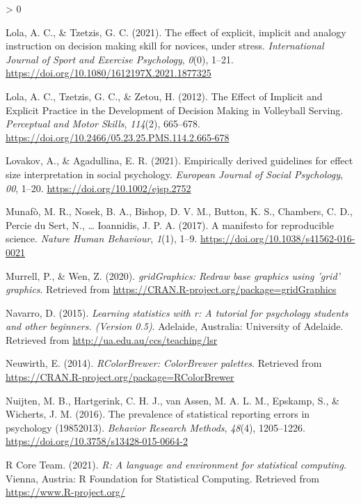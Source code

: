 \documentclass[
  english,
  man, donotrepeattitle,floatsintext]{apa7}
\newlength{\cslhangindent}
\newenvironment{CSLReferences}[2] %
 {%
  \setlength{\parindent}{0pt}
  \ifodd #1 \everypar{\setlength{\hangindent}{\cslhangindent}}\ignorespaces\fi
  \ifnum #2 > 0
  \setlength{\parskip}{#2\baselineskip}
  \fi
 }%
 {}
\begin{document}
\begin{CSLReferences}{1}{0}
\leavevmode\hypertarget{ref-lola2021}{}%
Lola, A. C., \& Tzetzis, G. C. (2021). The effect of explicit, implicit and analogy instruction on decision making skill for novices, under stress. \emph{International Journal of Sport and Exercise Psychology}, \emph{0}(0), 1--21. \url{https://doi.org/10.1080/1612197X.2021.1877325}

\leavevmode\hypertarget{ref-lola2012}{}%
Lola, A. C., Tzetzis, G. C., \& Zetou, H. (2012). The Effect of Implicit and Explicit Practice in the Development of Decision Making in Volleyball Serving. \emph{Perceptual and Motor Skills}, \emph{114}(2), 665--678. \url{https://doi.org/10.2466/05.23.25.PMS.114.2.665-678}

\leavevmode\hypertarget{ref-lovakov2021}{}%
Lovakov, A., \& Agadullina, E. R. (2021). Empirically derived guidelines for effect size interpretation in social psychology. \emph{European Journal of Social Psychology}, \emph{00}, 1--20. \url{https://doi.org/10.1002/ejsp.2752}

\leavevmode\hypertarget{ref-munafo2017}{}%
Munafò, M. R., Nosek, B. A., Bishop, D. V. M., Button, K. S., Chambers, C. D., Percie du Sert, N., \ldots{} Ioannidis, J. P. A. (2017). A manifesto for reproducible science. \emph{Nature Human Behaviour}, \emph{1}(1), 1--9. \url{https://doi.org/10.1038/s41562-016-0021}

\leavevmode\hypertarget{ref-R-gridGraphics}{}%
Murrell, P., \& Wen, Z. (2020). \emph{gridGraphics: Redraw base graphics using 'grid' graphics}. Retrieved from \url{https://CRAN.R-project.org/package=gridGraphics}

\leavevmode\hypertarget{ref-R-lsr}{}%
Navarro, D. (2015). \emph{Learning statistics with r: A tutorial for psychology students and other beginners. (Version 0.5)}. Adelaide, Australia: University of Adelaide. Retrieved from \url{http://ua.edu.au/ccs/teaching/lsr}

\leavevmode\hypertarget{ref-R-RColorBrewer}{}%
Neuwirth, E. (2014). \emph{RColorBrewer: ColorBrewer palettes}. Retrieved from \url{https://CRAN.R-project.org/package=RColorBrewer}

\leavevmode\hypertarget{ref-nuijten2016}{}%
Nuijten, M. B., Hartgerink, C. H. J., van Assen, M. A. L. M., Epskamp, S., \& Wicherts, J. M. (2016). The prevalence of statistical reporting errors in psychology (1985{{}}2013). \emph{Behavior Research Methods}, \emph{48}(4), 1205--1226. \url{https://doi.org/10.3758/s13428-015-0664-2}

\leavevmode\hypertarget{ref-R-base}{}%
R Core Team. (2021). \emph{R: A language and environment for statistical computing}. Vienna, Austria: R Foundation for Statistical Computing. Retrieved from \url{https://www.R-project.org/}


\end{CSLReferences}
\end{document}
